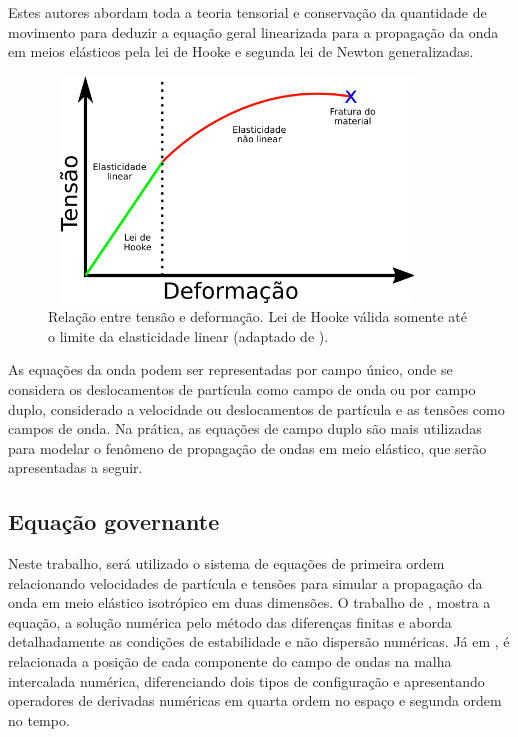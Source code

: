 \documentclass[
	12pt,				%
	openright,			%
	oneside,			%
	a4paper,			%
	english,			%
	brazil				%
	]{abntex2}
\begin{document}
	 Estes autores abordam toda a teoria tensorial e conservação da quantidade de movimento para deduzir a equação geral linearizada para a propagação da onda em meios elásticos pela lei de Hooke e segunda lei de Newton generalizadas. 

    \begin{figure}[htp!]
		\centering
		\includegraphics[width=10cm,height=6cm]{../imagens/stressStrain.png}
		\caption{Relação entre tensão e deformação. Lei de Hooke válida somente até o limite da elasticidade linear (adaptado de ).}
		\label{stressStrain}
	\end{figure}

	As equações da onda podem ser representadas por campo único, onde se considera os deslocamentos de partícula como campo de onda ou por campo duplo, considerado a velocidade ou deslocamentos de partícula e as tensões como campos de onda. Na prática, as equações de campo duplo são mais utilizadas para modelar o fenômeno de propagação de ondas em meio elástico, que serão apresentadas a seguir.
		
\subsection*{Equação governante}

	Neste trabalho, será utilizado o sistema de equações de primeira ordem relacionando velocidades de partícula e tensões para simular a propagação da onda em meio elástico isotrópico em duas dimensões. O trabalho de , mostra a equação, a solução numérica pelo método das diferenças finitas e aborda detalhadamente as condições de estabilidade e não dispersão numéricas. Já em , é relacionada a posição de cada componente do campo de ondas na malha intercalada numérica, diferenciando dois tipos de configuração e apresentando operadores de derivadas numéricas em quarta ordem no espaço e segunda ordem no tempo. 
	
\end{document}
